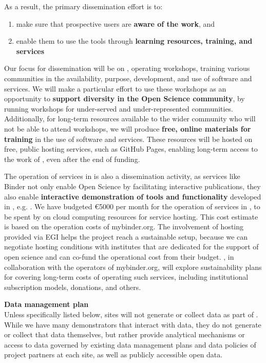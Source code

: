 As a result, the primary dissemination effort is to:

\begin{enumerate}
  \item make sure that prospective users are \textbf{aware of the work}, and
  \item enable them to use the tools through \textbf{learning resources, training, and services}
\end{enumerate}

Our focus for dissemination will be on ,
operating workshops, training various communities in the availability,
purpose, development, and use of \TheProject software and services.
We will make a particular effort to use these workshops as an opportunity
to \textbf{support diversity in the Open Science community},
by running workshops for under-served and under-represented communities.
Additionally, for long-term resources available to the wider community
who will not be able to attend workshops,
we will produce \textbf{free, online materials for training} in the use of \TheProject
software and services.
These resources will be hosted on free, public hosting services,
such as GitHub Pages,
enabling long-term access to the work of \TheProject,
even after the end of funding.

The operation of services in  is also a dissemination activity,
as services like Binder not only enable Open Science by facilitating interactive publications,
they also enable \textbf{interactive demonstration of tools and functionality}
developed in \TheProject, e.g. .
We have budgeted \euro 5000 per month for the operation of services in ,
to be spent by  on cloud computing resources for service hosting.
This cost estimate is based on the operation costs of mybinder.org.
The involvement of hosting provided via EGI helps the project reach a sustainable setup, because we can negotiate hosting conditions with institutes that are dedicated for the support of open science and can co-fund the operational cost from their budget.
\TheProject, in collaboration with the operators of mybinder.org,
will explore sustainability plans for covering long-term costs of operating such services,
including institutional subscription models, donations, and others.

\medskip
\noindent \textbf{Data management plan}\label{sec:data-management-plan}\\
Unless specifically listed below,
sites will not generate or collect data as part of \TheProject.
While we have many demonstrators that interact with data, they do not generate or collect that data themselves, but rather provide analytical mechanisms or access to data governed by existing data management plans and data policies of project partners at each site,
as well as publicly accessible open data.



